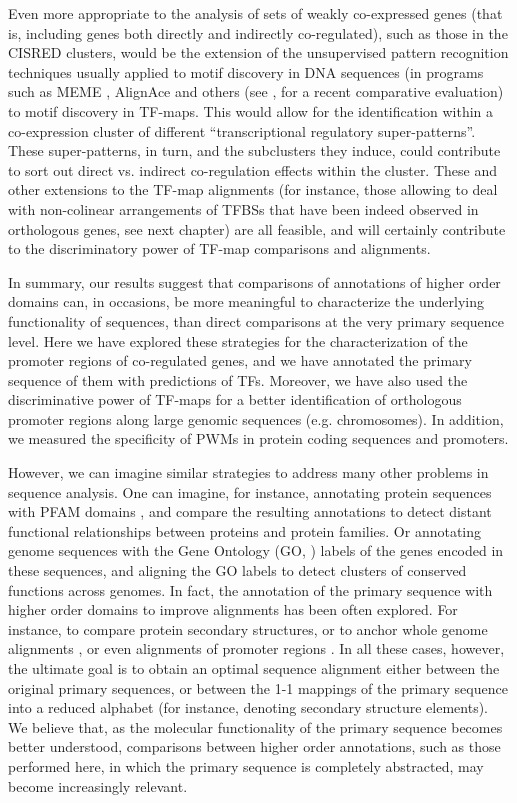 Even more appropriate to the analysis of sets of weakly co-expressed genes (that
is, including genes both directly and indirectly co-regulated), such
as those in the CISRED clusters, would be the extension of the
unsupervised pattern recognition techniques usually applied to motif
discovery in DNA sequences (in programs such as MEME
\citep{bailey:1994a}, AlignAce \citep{roth:1998a} and others (see
\citep{tompa:2005a}, for a recent comparative evaluation) to motif
discovery in TF-maps. This would allow for the identification within a
co-expression cluster of different ``transcriptional regulatory
super-patterns''.  These super-patterns, in turn, and the subclusters
they induce, could contribute to sort out direct vs. indirect
co-regulation effects within the cluster. These and other extensions
to the TF-map alignments (for instance, those allowing to deal with
non-colinear arrangements of TFBSs that have been indeed observed in
orthologous genes, see next chapter) are all feasible, and will
certainly contribute to the discriminatory power of TF-map comparisons
and alignments.

In summary, our results suggest that comparisons of annotations of
higher order domains can, in occasions, be more meaningful to
characterize the underlying functionality of sequences, than direct
comparisons at the very primary sequence level. Here we have explored
these strategies for the characterization of the promoter regions of
co-regulated genes, and we have annotated the primary sequence of them
with predictions of TFs. Moreover, we have also used the discriminative 
power of TF-maps for a better identification of orthologous promoter 
regions along large genomic sequences (e.g. chromosomes). In addition,
we measured the specificity of PWMs in protein coding sequences and 
promoters.

However, we can imagine similar strategies to
address many other problems in sequence analysis. One can imagine, for
instance, annotating protein sequences with PFAM domains
\citep{bateman:2004a}, and compare the resulting annotations to detect
distant functional relationships between proteins and protein
families. Or annotating genome sequences with the Gene Ontology (GO,
\citep{tgoc:2000a}) labels of the genes encoded in these sequences,
and aligning the GO labels to detect clusters of conserved functions
across genomes. In fact, the annotation of the primary sequence with
higher order domains to improve alignments has been often explored.  
For instance, to compare protein secondary structures, or to
anchor whole genome alignments \citep{batzoglou:2000a}, or
even alignments of promoter regions \citep{berezikov:2004a}. In all
these cases, however, the ultimate goal is to obtain an optimal
sequence alignment either between the original primary sequences, or
between the 1-1 mappings of the primary sequence into a reduced
alphabet (for instance, denoting secondary structure elements). We
believe that, as the molecular functionality of the primary sequence
becomes better understood, comparisons between higher order
annotations, such as those performed here, in which the primary
sequence is completely abstracted, may become increasingly relevant.


{}
